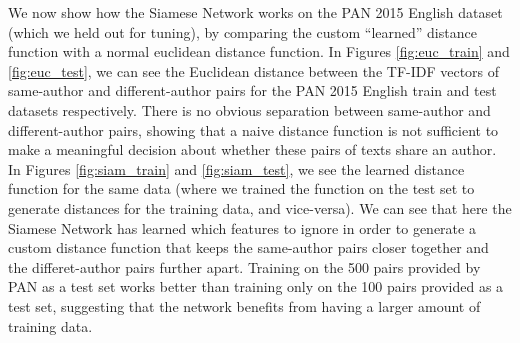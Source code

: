 We now show how the Siamese Network works on the PAN 2015 English dataset (which we held out for tuning), by comparing the custom ``learned'' distance function with a normal euclidean distance function. In Figures \ref{fig:euc_train} and \ref{fig:euc_test}, we can see the Euclidean distance between the TF-IDF vectors of same-author and different-author pairs for the PAN 2015 English train and test datasets respectively. There is no obvious separation between same-author and different-author pairs, showing that a naive distance function is not sufficient to make a meaningful decision about whether these pairs of texts share an author. In Figures \ref{fig:siam_train} and \ref{fig:siam_test}, we see the learned distance function for the same data (where we trained the function on the test set to generate distances for the training data, and vice-versa). We can see that here the Siamese Network has learned which features to ignore in order to generate a custom distance function that keeps the same-author pairs closer together and the differet-author pairs further apart. Training on the 500 pairs provided by PAN as a test set works better than training only on the 100 pairs provided as a test set, suggesting that the network benefits from having a larger amount of training data.


